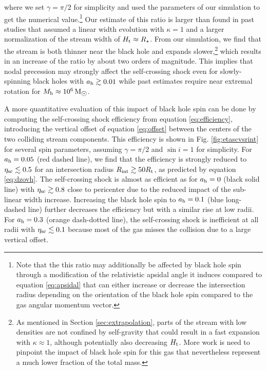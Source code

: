 \documentclass[a4paper,fleqn,usenatbib]{mnras}
\newcommand{\rstar}{R_{\star}}
\newcommand{\rt}{R_{\rm t}}
\newcommand{\rint}{R_{\rm int}}
\newcommand{\mh}{M_{\rm h}}
\def\msun{\, \mathrm{M}_{\hbox{$\odot$}}}
\begin{document}
where we set $\gamma = \pi/2$ for simplicity and used the parameters of our simulation to get the numerical value.\footnote{Note that the this ratio may additionally be affected by black hole spin through a modification of the relativistic apsidal angle it induces compared to equation \eqref{eq:apsidal} that can either increase or decrease the intersection radius depending on the orientation of the black hole spin compared to the gas angular momentum vector.} Our estimate of this ratio is larger than found in past studies \citep{guillochon2015,jiang2016} that assumed a linear width evolution with $\kappa = 1$ and a larger normalization of the stream width of $H_{\rm t} \approx \rstar$. From our simulation, we find that the stream is both thinner near the black hole and expands slower,\footnote{As mentioned in Section \ref{sec:extrapolation}, parts of the stream with low densities are not confined by self-gravity that could result in a fast expansion with $\kappa \approx 1$, although potentially also decreasing $H_{\rm t}$. More work is need to pinpoint the impact of black hole spin for this gas that nevertheless represent a much lower fraction of the total mass.} which results in an increase of the ratio by about two orders of magnitude. This implies that nodal precession may strongly affect the self-crossing shock even for slowly-spinning black holes with $a_{\rm h} \gtrsim 0.01$ while past estimates require near extremal rotation for $\mh \approx 10^6 \msun$.

A more quantitative evaluation of this impact of black hole spin can be done by computing the self-crossing shock efficiency from equation \eqref{eq:efficiency}, introducing the vertical offset of equation \eqref{eq:offset} between the centers of the two colliding stream components. This efficiency is shown in Fig. \ref{fig:etascvsrint} for several spin parameters, assuming $\gamma = \pi/2$ and $\sin i = 1$ for simplicity. For $a_{\rm h} = 0.05$ (red dashed line), we find that the efficiency is strongly reduced to $\eta_{\rm sc} \lesssim 0.5$ for an intersection radius $\rint \gtrsim 50 \rt$, as predicted by equation \eqref{eq:dzovh}. The self-crossing shock is almost as efficient as for $a_{\rm h}=0$ (black solid line) with $\eta_{\rm sc} \gtrsim 0.8$ close to pericenter due to the reduced impact of the sub-linear width increase. Increasing the black hole spin to $a_{\rm h} = 0.1$ (blue long-dashed line) further decreases the efficiency but with a similar rise at low radii. For $a_{\rm h} = 0.3$ (orange dash-dotted line), the self-crossing shock is inefficient at all radii with $\eta_{\rm sc} \lesssim 0.1$ because most of the gas misses the collision due to a large vertical offset.
\end{document}
